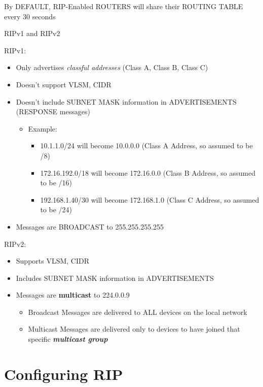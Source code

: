 By DEFAULT, RIP-Enabled ROUTERS will share their ROUTING TABLE every 30
seconds

RIPv1 and RIPv2

RIPv1:

\begin{itemize}
\tightlist
\item
  Only advertises \emph{classful addresses} (Class A, Class B, Class C)
\item
  Doesn't support VLSM, CIDR
\item
  Doesn't include SUBNET MASK information in ADVERTISEMENTS (RESPONSE
  messages)

  \begin{itemize}
  \tightlist
  \item
    Example:

    \begin{itemize}
    \tightlist
    \item
      10.1.1.0/24 will become 10.0.0.0 (Class A Address, so assumed to
      be /8)
    \item
      172.16.192.0/18 will become 172.16.0.0 (Class B Address, so
      assumed to be /16)
    \item
      192.168.1.40/30 will become 172.168.1.0 (Class C Address, so
      assumed to be /24)
    \end{itemize}
  \end{itemize}
\item
  Messages are BROADCAST to 255.255.255.255
\end{itemize}

RIPv2:

\begin{itemize}
\tightlist
\item
  Supports VLSM, CIDR
\item
  Includes SUBNET MASK information in ADVERTISEMENTS
\item
  Messages are \textbf{multicast} to 224.0.0.9

  \begin{itemize}
  \tightlist
  \item
    Broadcast Messages are delivered to ALL devices on the local network
  \item
    Multicast Messages are delivered only to devices to have joined that
    specific \textbf{\emph{multicast group}}
  \end{itemize}
\end{itemize}

\section{Configuring RIP}\label{configuring-rip}

